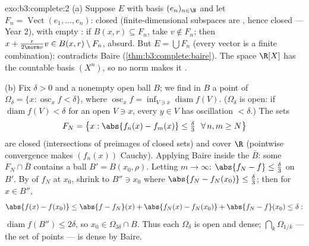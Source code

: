 \begin{solution}{exo:b3:complete:2}
(a) Suppose $E$  with  basis $(e_n)_{n\in\N}$
and let $F_n = \operatorname{Vect}(e_1, \dots, e_n)$: closed
(finite-dimensional subspaces are , hence closed ---
Year 2), with empty : if $B(x, r) \subseteq F_n$, take
$v \notin F_n$; then $x + \frac{r}{2\norm v}v \in B(x,r)
\setminus F_n$, absurd. But $E = \bigcup F_n$ (every vector is
a finite combination): contradicts Baire
(\cref{thm:b3:complete:baire}). The space $\R[X]$ has the
countable basis $(X^n)$, so no norm makes it .

(b) Fix $\delta > 0$ and a nonempty open ball $B$; we find in
$B$ a point of $\Omega_\delta = \{x : \operatorname{osc}_xf <
\delta\}$, where $\operatorname{osc}_xf = \inf_{V \ni
x}\operatorname{diam} f(V)$. ($\Omega_\delta$ is open: if
$\operatorname{diam}f(V) < \delta$ for an open $V \ni x$, every
$y \in V$ has oscillation $< \delta$.) The sets
\[
F_N = \bigl\{x : \abs{f_n(x) - f_m(x)} \leq \tfrac\delta3\
\ \forall\, n, m \geq N \bigr\}
\]
are closed (intersections of preimages of closed sets) and
cover $\R$ (pointwise convergence makes $(f_n(x))$ Cauchy).
Applying Baire inside the  $\bar B$: some $F_N \cap
\bar B$ contains a ball $B' = B(x_0, \rho)$. Letting $m \to
\infty$: $\abs{f_N - f} \leq \frac\delta3$ on $B'$. By
 of $f_N$ at $x_0$, shrink to $B'' \ni x_0$ where
$\abs{f_N - f_N(x_0)} \leq \frac\delta3$; then for $x \in B''$,
\[
\abs{f(x) - f(x_0)} \leq \abs{f - f_N}(x) + \abs{f_N(x) -
f_N(x_0)} + \abs{f_N - f}(x_0) \leq \delta:
\]
$\operatorname{diam} f(B'') \leq 2\delta$, so $x_0 \in
\Omega_{3\delta} \cap B$. Thus each $\Omega_\delta$ is open and
dense; $\bigcap_k\Omega_{1/k}$ --- the set of  points
--- is dense by Baire.
\end{solution}


